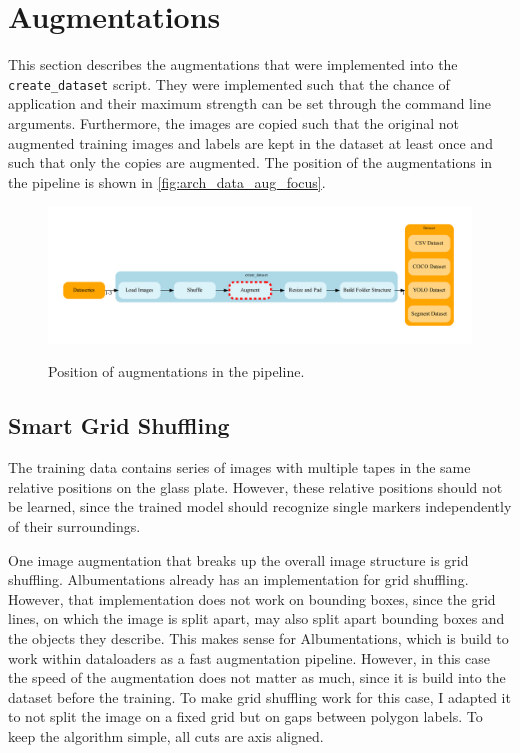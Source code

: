 \documentclass[10pt]{book}
\newcommand{\figureref}[1]{\autoref{#1}}
\begin{document}
\section{Augmentations}

This section describes the augmentations that were implemented into the \texttt{create\_dataset} script. They were implemented such that the chance of application and their maximum strength can be set through the command line arguments. Furthermore, the images are copied such that the original not augmented training images and labels are kept in the dataset at least once and such that only the copies are augmented. The position of the augmentations in the pipeline is shown in \figureref{fig:arch_data_aug_focus}.

\begin{figure}
  \caption{Position of augmentations in the pipeline.}
  \includegraphics[width=\textwidth]{graph/arch_data_aug_focus}
  \label{fig:arch_data_aug_focus}
\end{figure}

\subsection{Smart Grid Shuffling}

The training data contains series of images with multiple tapes in the same relative positions on the glass plate. However, these relative positions should not be learned, since the trained model should recognize single markers independently of their surroundings. 

One image augmentation that breaks up the overall image structure is grid shuffling. Albumentations already has an implementation for grid shuffling. However, that implementation does not work on bounding boxes, since the grid lines, on which the image is split apart, may also split apart bounding boxes and the objects they describe. This makes sense for Albumentations, which is build to work within dataloaders as a fast augmentation pipeline. However, in this case the speed of the augmentation does not matter as much, since it is build into the dataset before the training. To make grid shuffling work for this case, I adapted it to not split the image on a fixed grid but on gaps between polygon labels. To keep the algorithm simple, all cuts are axis aligned.
\end{document}
